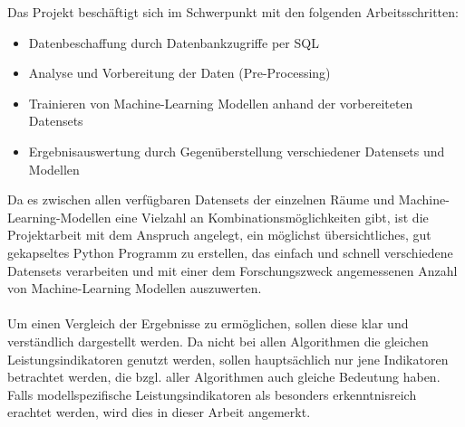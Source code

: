 Das Projekt beschäftigt sich im Schwerpunkt mit den folgenden Arbeitsschritten:
\begin{itemize}
    \item Datenbeschaffung durch Datenbankzugriffe per SQL
    \item Analyse und Vorbereitung der Daten (Pre-Processing)
    \item Trainieren von Machine-Learning Modellen anhand der vorbereiteten Datensets
    \item Ergebnisauswertung durch Gegenüberstellung verschiedener Datensets und Modellen
\end{itemize}
Da es zwischen allen verfügbaren Datensets der einzelnen Räume und Machine-Learning-Modellen eine Vielzahl an
Kombinationsmöglichkeiten gibt, ist die Projektarbeit mit dem Anspruch angelegt, ein möglichst übersichtliches, 
gut gekapseltes Python Programm zu erstellen, das einfach und schnell verschiedene Datensets  
verarbeiten und mit einer dem Forschungszweck angemessenen Anzahl von Machine-Learning Modellen auszuwerten. \\\\
Um einen Vergleich der Ergebnisse zu ermöglichen, sollen diese klar und verständlich dargestellt werden. 
Da nicht bei allen Algorithmen die gleichen Leistungsindikatoren genutzt werden, sollen hauptsächlich nur 
jene Indikatoren betrachtet werden, die bzgl. aller Algorithmen auch gleiche Bedeutung haben. Falls 
modellspezifische Leistungsindikatoren als besonders erkenntnisreich erachtet werden, wird dies in dieser Arbeit
angemerkt.